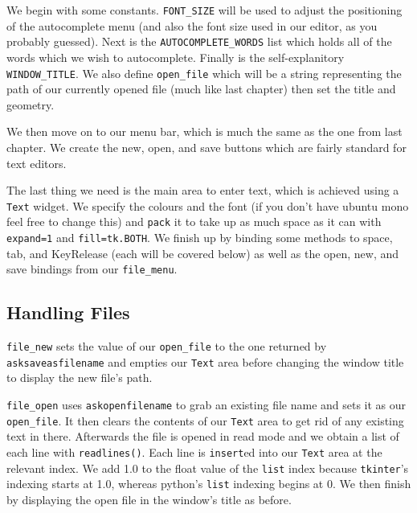 \documentclass[a4paper,11pt,openany]{book}
\begin{document}
We begin with some constants. \lstinline[columns=fixed]{FONT_SIZE} will be used to adjust the positioning of the autocomplete menu (and also the font size used in our editor, as you probably guessed). Next is the \lstinline[columns=fixed]{AUTOCOMPLETE_WORDS} list which holds all of the words which we wish to autocomplete. Finally is the self-explanitory \lstinline[columns=fixed]{WINDOW_TITLE}. We also define \lstinline[columns=fixed]{open_file} which will be a string representing the path of our currently opened file (much like last chapter) then set the title and geometry.

\vspace{5mm}

We then move on to our menu bar, which is much the same as the one from last chapter. We create the new, open, and save buttons which are fairly standard for text editors.

\vspace{5mm}

The last thing we need is the main area to enter text, which is achieved using a \lstinline[columns=fixed]{Text} widget. We specify the colours and the font (if you don't have ubuntu mono feel free to change this) and \lstinline[columns=fixed]{pack} it to take up as much space as it can with \lstinline[columns=fixed]{expand=1} and \lstinline[columns=fixed]{fill=tk.BOTH}. We finish up by binding some methods to space, tab, and KeyRelease (each will be covered below) as well as the open, new, and save bindings from our \lstinline[columns=fixed]{file_menu}.

\subsection{Handling Files}

\lstinline[columns=fixed]{file_new} sets the value of our \lstinline[columns=fixed]{open_file} to the one returned by \lstinline[columns=fixed]{asksaveasfilename} and empties our \lstinline[columns=fixed]{Text} area before changing the window title to display the new file's path.

\vspace{5mm}

\lstinline[columns=fixed]{file_open} uses \lstinline[columns=fixed]{askopenfilename} to grab an existing file name and sets it as our \lstinline[columns=fixed]{open_file}. It then clears the contents of our \lstinline[columns=fixed]{Text} area to get rid of any existing text in there. Afterwards the file is opened in read mode and we obtain a list of each line with \lstinline[columns=fixed]{readlines()}. Each line is \lstinline[columns=fixed]{insert}ed into our \lstinline[columns=fixed]{Text} area at the relevant index. We add 1.0 to the float value of the \lstinline[columns=fixed]{list} index because \lstinline[columns=fixed]{tkinter}'s indexing starts at 1.0, whereas python's \lstinline[columns=fixed]{list} indexing begins at 0. We then finish by displaying the open file in the window's title as before.
\end{document}
